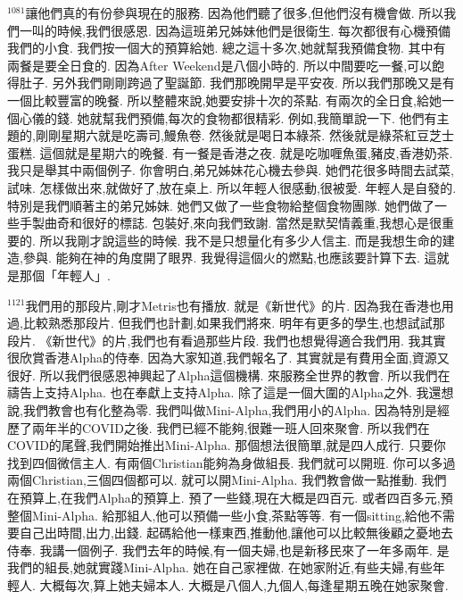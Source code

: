 \documentclass{book}
\begin{document}
$^{1081}$讓他們真的有份參與現在的服務.
因為他們聽了很多,但他們沒有機會做.
所以我們一叫的時候,我們很感恩.
因為這班弟兄姊妹他們是很衛生.
每次都很有心機預備我們的小食.
我們按一個大的預算給她.
總之這十多次,她就幫我預備食物.
其中有兩餐是要全日食的.
因為After Weekend是八個小時的.
所以中間要吃一餐,可以飽得肚子.
另外我們剛剛跨過了聖誕節.
我們那晚開早是平安夜.
所以我們那晚又是有一個比較豐富的晚餐.
所以整體來說,她要安排十次的茶點.
有兩次的全日食,給她一個心儀的錢.
她就幫我們預備,每次的食物都很精彩.
例如,我簡單說一下.
他們有主題的,剛剛星期六就是吃壽司,鰻魚卷.
然後就是喝日本綠茶.
然後就是綠茶紅豆芝士蛋糕.
這個就是星期六的晚餐.
有一餐是香港之夜.
就是吃咖喱魚蛋,豬皮,香港奶茶.
我只是舉其中兩個例子.
你會明白,弟兄姊妹花心機去參與.
她們花很多時間去試菜,試味.
怎樣做出來,就做好了,放在桌上.
所以年輕人很感動,很被愛.
年輕人是自發的.
特別是我們順著主的弟兄姊妹.
她們又做了一些食物給整個食物團隊.
她們做了一些手製曲奇和很好的標誌.
包裝好,來向我們致謝.
當然是默契情義重,我想心是很重要的.
所以我剛才說這些的時候.
我不是只想量化有多少人信主.
而是我想生命的建造,參與.
能夠在神的角度開了眼界.
我覺得這個火的燃點,也應該要計算下去.
這就是那個「年輕人」.

$^{1121}$我們用的那段片,剛才Metris也有播放.
就是《新世代》的片.
因為我在香港也用過,比較熟悉那段片.
但我們也計劃,如果我們將來.
明年有更多的學生,也想試試那段片.
《新世代》的片,我們也有看過那些片段.
我們也想覺得適合我們用.
我其實很欣賞香港Alpha的侍奉.
因為大家知道,我們報名了.
其實就是有費用全面,資源又很好.
所以我們很感恩神興起了Alpha這個機構.
來服務全世界的教會.
所以我們在禱告上支持Alpha.
也在奉獻上支持Alpha.
除了這是一個大圍的Alpha之外.
我還想說,我們教會也有化整為零.
我們叫做Mini-Alpha,我們用小的Alpha.
因為特別是經歷了兩年半的COVID之後.
我們已經不能夠,很難一班人回來聚會.
所以我們在COVID的尾聲,我們開始推出Mini-Alpha.
那個想法很簡單,就是四人成行.
只要你找到四個微信主人.
有兩個Christian能夠為身做組長.
我們就可以開班.
你可以多過兩個Christian,三個四個都可以.
就可以開Mini-Alpha.
我們教會做一點推動.
我們在預算上,在我們Alpha的預算上.
預了一些錢,現在大概是四百元.
或者四百多元,預整個Mini-Alpha.
給那組人,他可以預備一些小食,茶點等等.
有一個sitting,給他不需要自己出時間,出力,出錢.
起碼給他一樣東西,推動他,讓他可以比較無後顧之憂地去侍奉.
我講一個例子.
我們去年的時候,有一個夫婦,也是新移民來了一年多兩年.
是我們的組長,她就實踐Mini-Alpha.
她在自己家裡做.
在她家附近,有些夫婦,有些年輕人.
大概每次,算上她夫婦本人.
大概是八個人,九個人,每逢星期五晚在她家聚會.
\end{document}
